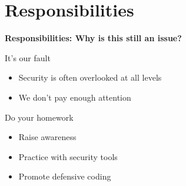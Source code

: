 
\section{Responsibilities}

{
\begin{frame}[plain]
    \begin{center}
      \Huge\bfseries
      Responsibilities: Why is this still an issue?
    \end{center}
\end{frame}
}

\begin{frame}[plain]{It's our fault}
  \begin{itemize}
    \item Security is often overlooked at all levels
    \item We don't pay enough attention
  \end{itemize}
\end{frame}

\begin{frame}[plain]{Do your homework}
  \begin{itemize}
    \item Raise awareness
    \item Practice with security tools
    \item Promote defensive coding
  \end{itemize}
\end{frame}
